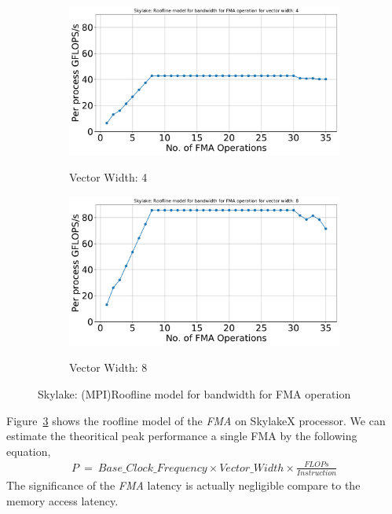 \documentclass[sigconf,review,anonymous]{acmart}
\begin{document}
\begin{figure}[hbt!]
  \centering
  \begin{subfigure}[b]{.48\linewidth}
    \includegraphics[width=\linewidth]{figures/fma/skylake_mpi_fma_roofline_model_for_vec_4.pdf}
    \label{fig:mpi-skl-vec-4}
    \caption{Vector Width: 4}
  \end{subfigure}
  \begin{subfigure}[b]{.48\linewidth}
    \includegraphics[width=\linewidth]{figures/fma/skylake_mpi_fma_roofline_model_for_vec_8.pdf}
    \label{fig:mpi-skl-vec-8}
    \caption{Vector Width: 8}
  \end{subfigure}
  \caption{Skylake: (MPI)Roofline model for bandwidth for FMA operation}
  \label{fig:mpi-skl-fma}
\end{figure}

Figure~\ref{fig:mpi-skl-fma} shows the roofline model of the \textit{FMA} on SkylakeX processor. 
We can estimate the theoritical peak performance a single FMA by the following equation,
\begin{eqnarray*}
P\ =\ Base\_Clock\_Frequency\times Vector\_Width\times \frac{FLOPs}{Instruction}
\end{eqnarray*}
The significance of the \textit{FMA} 
latency is actually negligible compare to the memory access latency. 
\end{document}
